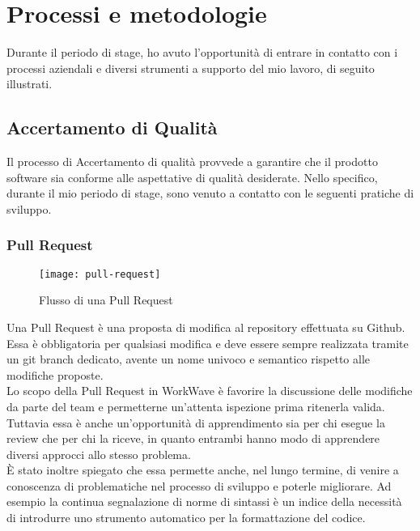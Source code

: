 
\chapter{Processi e metodologie}
\label{cap:processi-metodologie}

Durante il periodo di stage, ho avuto l'opportunità di entrare in contatto con i processi aziendali e diversi strumenti a supporto del mio lavoro, di seguito illustrati.

\section{Accertamento di Qualità}

Il processo di Accertamento di qualità provvede a garantire che il prodotto software sia conforme alle aspettative di qualità desiderate. Nello specifico, durante il mio periodo di stage, sono venuto a contatto con le seguenti pratiche di sviluppo.

\subsection{Pull Request}

\begin{figure}[H] 
  \centering 
  \texttt{[image: pull-request]} 
  \caption{Flusso di una Pull Request}
\end{figure}

Una Pull Request è una proposta di modifica al repository effettuata su Github. Essa è obbligatoria per qualsiasi modifica e deve essere sempre realizzata tramite un git branch dedicato, avente un nome univoco e semantico rispetto alle modifiche proposte. \\

Lo scopo della Pull Request in WorkWave è favorire la discussione delle modifiche da parte del team e permetterne un'attenta ispezione prima ritenerla valida. Tuttavia essa è anche un'opportunità di apprendimento sia per chi esegue la review che per chi la riceve, in quanto entrambi hanno modo di apprendere diversi approcci allo stesso problema. \\

È stato inoltre spiegato che essa permette anche, nel lungo termine, di venire a conoscenza di problematiche nel processo di sviluppo e poterle migliorare. Ad esempio la continua segnalazione di norme di sintassi è un indice della necessità di introdurre uno strumento automatico per la formattazione del codice.

